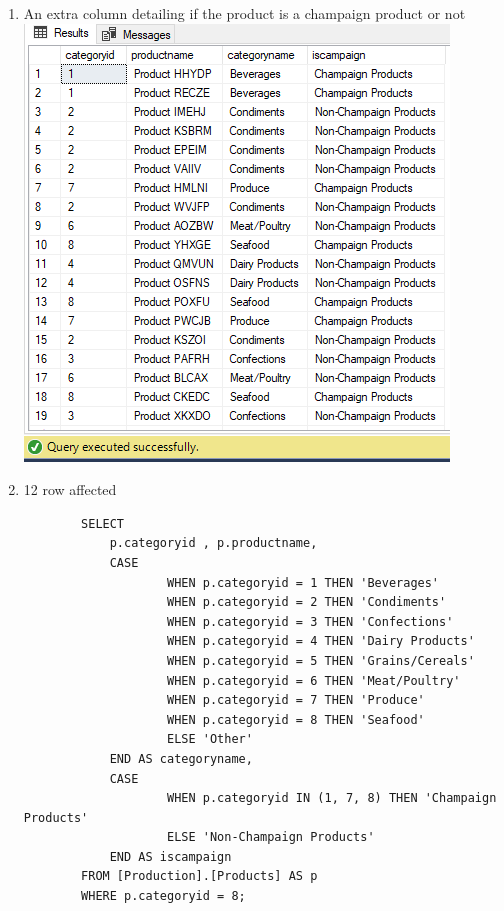 \documentclass[12pt,titlepage]{article}
\begin{document}
\begin{enumerate}
{    }
    \newpage
    \item An extra column detailing if the product is a champaign product or not\\
    \includegraphics[width=.9\textwidth]{images/figures/fig5.png}
    \newpage
    \item 12 row affected
    \begin{verbatim}
        SELECT
            p.categoryid , p.productname,
            CASE
                    WHEN p.categoryid = 1 THEN 'Beverages'
                    WHEN p.categoryid = 2 THEN 'Condiments'
                    WHEN p.categoryid = 3 THEN 'Confections'
                    WHEN p.categoryid = 4 THEN 'Dairy Products'
                    WHEN p.categoryid = 5 THEN 'Grains/Cereals'
                    WHEN p.categoryid = 6 THEN 'Meat/Poultry'
                    WHEN p.categoryid = 7 THEN 'Produce'
                    WHEN p.categoryid = 8 THEN 'Seafood'
                    ELSE 'Other'
            END AS categoryname,
            CASE
                    WHEN p.categoryid IN (1, 7, 8) THEN 'Champaign Products'
                    ELSE 'Non-Champaign Products'
            END AS iscampaign
        FROM [Production].[Products] AS p
        WHERE p.categoryid = 8;
    \end{verbatim}
    \resizebox{.9\textwidth}{!}{
}
\end{enumerate}
\end{document}
